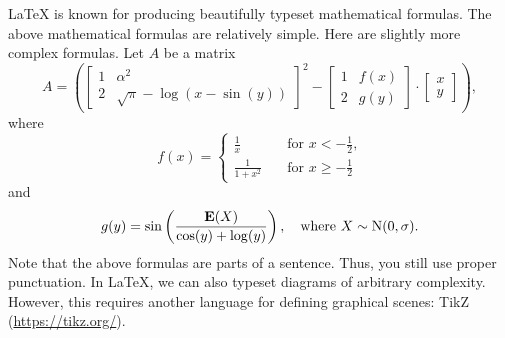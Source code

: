 \documentclass[english, twoside, 12pt, a4paper]{article}
\theoremstyle{definition}
\theoremstyle{plain}
\theoremstyle{remark}
\begin{document}
\LaTeX{} is known for producing beautifully typeset mathematical formulas. The above mathematical formulas are relatively simple. Here are slightly more complex formulas. Let \(A\) be a matrix
\[
A =
\left(
\begin{bmatrix}
1                   & \alpha^2       \\
2                   & \sqrt{\pi} - \log(x-\sin(y))
\end{bmatrix}^{2}
- 
\begin{bmatrix}
1                   & f(x)           \\
2                   & g(y)
\end{bmatrix}
\cdot
\begin{bmatrix}
x                                    \\
y
\end{bmatrix}
\right),
\]
where
\[
f(x) = 
\left\{
  \begin{aligned}
    \frac{1}{x}     & \quad \text{for \(x<-\frac{1}{2}\),} \\
    \frac{1}{1+x^2} & \quad \text{for \(x \geq -\frac{1}{2}\)}
  \end{aligned}
\right.
\]
and
\[
g(y) = \sin\left(\frac{\mathrm{\mathbf{E}}(X)}{\cos(y) + \log(y)}\right), 
\quad\text{where \( X \sim \mathrm{N}(0, \sigma)  \).}
\]
Note that the above formulas are parts of a sentence. Thus, you still use proper punctuation. In \LaTeX{}, we can also typeset diagrams of arbitrary complexity. However, this requires another language for defining graphical scenes: TikZ (\url{https://tikz.org/}). 
\end{document}
